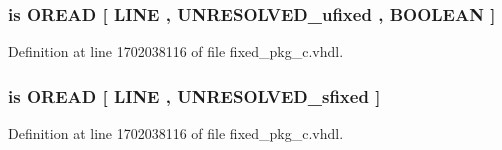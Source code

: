 \subsubsection[{O\+C\+T\+A\+L\+\_\+\+R\+E\+A\+D}]{ {\bfseries \textcolor{keywordflow}{is}\textcolor{vhdlchar}{ }\textcolor{vhdlchar}{O\+R\+E\+A\+D}\textcolor{vhdlchar}{ }\textcolor{vhdlchar}{\mbox{[}}\textcolor{vhdlchar}{ }\textcolor{vhdlchar}{L\+I\+N\+E}\textcolor{vhdlchar}{ }\textcolor{vhdlchar}{,}\textcolor{vhdlchar}{ }{\bfseries {\bf U\+N\+R\+E\+S\+O\+L\+V\+E\+D\+\_\+ufixed}} \textcolor{vhdlchar}{ }\textcolor{vhdlchar}{,}\textcolor{vhdlchar}{ }\textcolor{comment}{B\+O\+O\+L\+E\+A\+N}\textcolor{vhdlchar}{ }\textcolor{vhdlchar}{\mbox{]}}\textcolor{vhdlchar}{ }} \hspace{0.3cm}{\ttfamily [Alias]}}\label{classfixed__pkg_a5d11047f49ec5274897efe747f6e82e2}


Definition at line 1702038116 of file fixed\+\_\+pkg\+\_\+c.\+vhdl.

\hypertarget{classfixed__pkg_a4ab4e92391fed32bf87cf04d7f37fd7c}{}
\subsubsection[{O\+C\+T\+A\+L\+\_\+\+R\+E\+A\+D}]{ {\bfseries \textcolor{keywordflow}{is}\textcolor{vhdlchar}{ }\textcolor{vhdlchar}{O\+R\+E\+A\+D}\textcolor{vhdlchar}{ }\textcolor{vhdlchar}{\mbox{[}}\textcolor{vhdlchar}{ }\textcolor{vhdlchar}{L\+I\+N\+E}\textcolor{vhdlchar}{ }\textcolor{vhdlchar}{,}\textcolor{vhdlchar}{ }{\bfseries {\bf U\+N\+R\+E\+S\+O\+L\+V\+E\+D\+\_\+sfixed}} \textcolor{vhdlchar}{ }\textcolor{vhdlchar}{\mbox{]}}\textcolor{vhdlchar}{ }} \hspace{0.3cm}{\ttfamily [Alias]}}\label{classfixed__pkg_a4ab4e92391fed32bf87cf04d7f37fd7c}


Definition at line 1702038116 of file fixed\+\_\+pkg\+\_\+c.\+vhdl.

\hypertarget{classfixed__pkg_a0d43978dadf4fc835a91a1460e5778b7}{}
